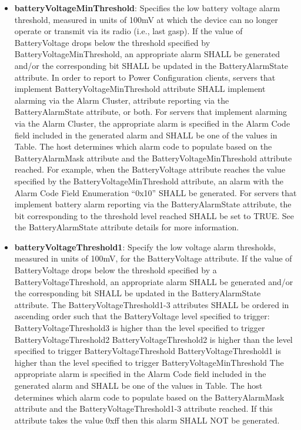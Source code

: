 \begin{itemize}
\item \textbf{batteryVoltageMinThreshold}: Specifies the low battery voltage alarm threshold, measured in units of 100mV at which the device can no longer operate or transmit via its radio (i.e., last gasp). If the value of BatteryVoltage drops below the threshold specified by BatteryVoltageMinThreshold, an appropriate alarm SHALL be generated and/or the corresponding bit SHALL be updated in the BatteryAlarmState attribute. In order to report to Power Configuration clients, servers that implement BatteryVoltageMinThreshold attribute SHALL implement alarming via the Alarm Cluster, attribute reporting via the BatteryAlarmState attribute, or both. For servers that implement alarming via the Alarm Cluster, the appropriate alarm is specified in the Alarm Code field included in the generated alarm and SHALL be one of the values in Table. The host determines which alarm code to populate based on the BatteryAlarmMask attribute and the BatteryVoltageMinThreshold attribute reached. For example, when the BatteryVoltage attribute reaches the value specified by the BatteryVoltageMinThreshold attribute, an alarm with the Alarm Code Field Enumeration “0x10” SHALL be generated. For servers that implement battery alarm reporting via the BatteryAlarmState attribute, the bit corresponding to the threshold level reached SHALL be set to TRUE. See the BatteryAlarmState attribute details for more information.
\item \textbf{batteryVoltageThreshold1}: Specify the low voltage alarm thresholds, measured in units of 100mV, for the BatteryVoltage attribute. If the value of BatteryVoltage drops below the threshold specified by a BatteryVoltageThreshold, an appropriate alarm SHALL be generated and/or the corresponding bit SHALL be updated in the BatteryAlarmState attribute. The BatteryVoltageThreshold1-3 attributes SHALL be ordered in ascending order such that the BatteryVoltage level specified to trigger: BatteryVoltageThreshold3 is higher than the level specified to trigger BatteryVoltageThreshold2 BatteryVoltageThreshold2 is higher than the level specified to trigger BatteryVoltageThreshold BatteryVoltageThreshold1 is higher than the level specified to trigger BatteryVoltageMinThreshold The appropriate alarm is specified in the Alarm Code field included in the generated alarm and SHALL be one of the values in Table. The host determines which alarm code to populate based on the BatteryAlarmMask attribute and the BatteryVoltageThreshold1-3 attribute reached. If this attribute takes the value 0xff then this alarm SHALL NOT be generated.

\end{itemize}
